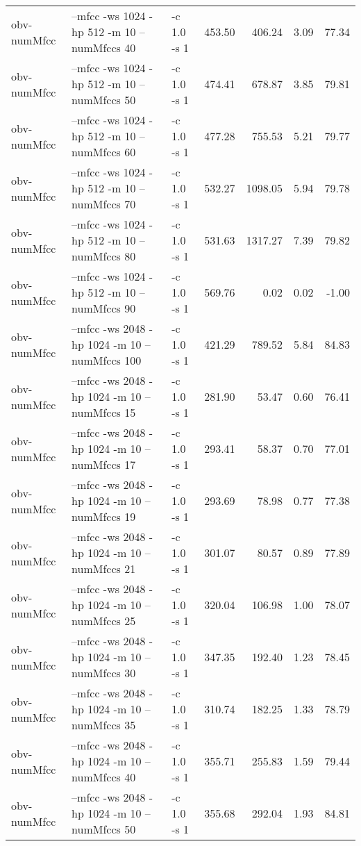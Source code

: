 \documentclass[11pt,a4paper]{article}
\begin{document}
\begin{tabular}{lllrrrr}
 obv-numMfcc   &  --mfcc -ws 1024 -hp 512 -m 10 --numMfccs 40    &  -c 1.0 -s 1  &  453.50  &   406.24  &   3.09  &  77.34  \\
 obv-numMfcc   &  --mfcc -ws 1024 -hp 512 -m 10 --numMfccs 50    &  -c 1.0 -s 1  &  474.41  &   678.87  &   3.85  &  79.81  \\
 obv-numMfcc   &  --mfcc -ws 1024 -hp 512 -m 10 --numMfccs 60    &  -c 1.0 -s 1  &  477.28  &   755.53  &   5.21  &  79.77  \\
 obv-numMfcc   &  --mfcc -ws 1024 -hp 512 -m 10 --numMfccs 70    &  -c 1.0 -s 1  &  532.27  &  1098.05  &   5.94  &  79.78  \\
 obv-numMfcc   &  --mfcc -ws 1024 -hp 512 -m 10 --numMfccs 80    &  -c 1.0 -s 1  &  531.63  &  1317.27  &   7.39  &  79.82  \\
 obv-numMfcc   &  --mfcc -ws 1024 -hp 512 -m 10 --numMfccs 90    &  -c 1.0 -s 1  &  569.76  &     0.02  &   0.02  &  -1.00  \\
 obv-numMfcc   &  --mfcc -ws 2048 -hp 1024 -m 10 --numMfccs 100  &  -c 1.0 -s 1  &  421.29  &   789.52  &   5.84  &  84.83  \\
 obv-numMfcc   &  --mfcc -ws 2048 -hp 1024 -m 10 --numMfccs 15   &  -c 1.0 -s 1  &  281.90  &    53.47  &   0.60  &  76.41  \\
 obv-numMfcc   &  --mfcc -ws 2048 -hp 1024 -m 10 --numMfccs 17   &  -c 1.0 -s 1  &  293.41  &    58.37  &   0.70  &  77.01  \\
 obv-numMfcc   &  --mfcc -ws 2048 -hp 1024 -m 10 --numMfccs 19   &  -c 1.0 -s 1  &  293.69  &    78.98  &   0.77  &  77.38  \\
 obv-numMfcc   &  --mfcc -ws 2048 -hp 1024 -m 10 --numMfccs 21   &  -c 1.0 -s 1  &  301.07  &    80.57  &   0.89  &  77.89  \\
 obv-numMfcc   &  --mfcc -ws 2048 -hp 1024 -m 10 --numMfccs 25   &  -c 1.0 -s 1  &  320.04  &   106.98  &   1.00  &  78.07  \\
 obv-numMfcc   &  --mfcc -ws 2048 -hp 1024 -m 10 --numMfccs 30   &  -c 1.0 -s 1  &  347.35  &   192.40  &   1.23  &  78.45  \\
 obv-numMfcc   &  --mfcc -ws 2048 -hp 1024 -m 10 --numMfccs 35   &  -c 1.0 -s 1  &  310.74  &   182.25  &   1.33  &  78.79  \\
 obv-numMfcc   &  --mfcc -ws 2048 -hp 1024 -m 10 --numMfccs 40   &  -c 1.0 -s 1  &  355.71  &   255.83  &   1.59  &  79.44  \\
 obv-numMfcc   &  --mfcc -ws 2048 -hp 1024 -m 10 --numMfccs 50   &  -c 1.0 -s 1  &  355.68  &   292.04  &   1.93  &  84.81  \\

\end{tabular}
\end{document}
